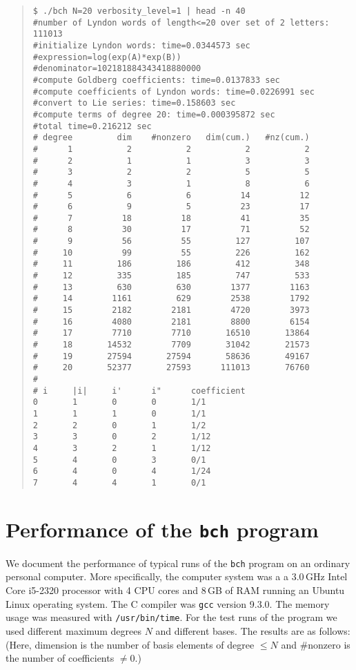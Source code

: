 \documentclass[11pt,a4paper]{article}
\begin{document}
\begin{quote} %
{\small\begin{verbatim}
$ ./bch N=20 verbosity_level=1 | head -n 40
#number of Lyndon words of length<=20 over set of 2 letters: 111013
#initialize Lyndon words: time=0.0344573 sec
#expression=log(exp(A)*exp(B))
#denominator=102181884343418880000
#compute Goldberg coefficients: time=0.0137833 sec
#compute coefficients of Lyndon words: time=0.0226991 sec
#convert to Lie series: time=0.158603 sec
#compute terms of degree 20: time=0.000395872 sec
#total time=0.216212 sec
# degree         dim    #nonzero   dim(cum.)   #nz(cum.)
#      1           2           2           2           2
#      2           1           1           3           3
#      3           2           2           5           5
#      4           3           1           8           6
#      5           6           6          14          12
#      6           9           5          23          17
#      7          18          18          41          35
#      8          30          17          71          52
#      9          56          55         127         107
#     10          99          55         226         162
#     11         186         186         412         348
#     12         335         185         747         533
#     13         630         630        1377        1163
#     14        1161         629        2538        1792
#     15        2182        2181        4720        3973
#     16        4080        2181        8800        6154
#     17        7710        7710       16510       13864
#     18       14532        7709       31042       21573
#     19       27594       27594       58636       49167
#     20       52377       27593      111013       76760
#
# i     |i|     i'      i"      coefficient
0       1       0       0       1/1
1       1       1       0       1/1
2       2       0       1       1/2
3       3       0       2       1/12
4       3       2       1       1/12
5       4       0       3       0/1
6       4       0       4       1/24
7       4       4       1       0/1
\end{verbatim}
}\end{quote}

\section{Performance of the {\tt bch} program}
We document the performance of typical runs of the \verb|bch|
program on an ordinary personal computer.
More specifically, the computer system was a
a 3.0\,GHz Intel Core i5-2320 processor with 4 CPU cores and
8\,GB of RAM running an Ubuntu Linux operating system. The 
C compiler was \verb|gcc| version 9.3.0.
The memory usage was measured with \verb|/usr/bin/time|.
For the test runs of the program we used different 
maximum degrees $N$ and different bases. The results
are as follows: (Here, dimension is the number of basis elements of degree $\leq N$
and \#nonzero is the number of coefficients $\neq 0$.)
\end{document}
